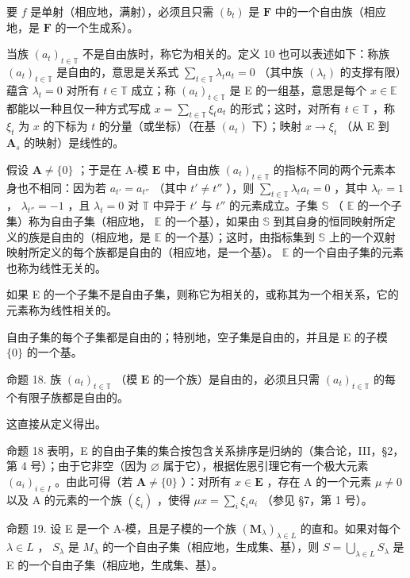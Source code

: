要 \(f\) 是单射（相应地，满射），必须且只需 \((b_t)\) 是 \(\mathbf{F}\) 中的一个自由族（相应地，是 \(\mathbf{F}\) 的一个生成系）。

当族 \((a_{t})_{t\in \mathbb{T}}\) 不是自由族时，称它为相关的。定义 10 也可以表述如下：称族 \((a_{t})_{t\in \mathbb{T}}\) 是自由的，意思是关系式 \(\sum_{t\in \mathbb{T}}\lambda_t a_t = 0\) （其中族 \((\lambda_t)\) 的支撑有限）蕴含 \(\lambda_{t} = 0\) 对所有 \(t\in \mathbb{T}\) 成立；称 \((a_{t})_{t\in \mathbb{T}}\) 是 E 的一组基，意思是每个 \(x\in \mathbb{E}\) 都能以一种且仅一种方式写成 \(x = \sum_{t\in \mathbb{T}}\xi_t a_t\) 的形式；这时，对所有 \(t\in \mathbb{T}\) ，称 \(\xi_{t}\) 为 \(x\) 的下标为 \(t\) 的分量（或坐标）（在基 \((a_{t})\) 下）；映射 \(x\to \xi_t\) （从 E 到 \(\mathbf{A}_s\) 的映射）是线性的。

假设 \(\mathbf{A} \neq \{0\}\) ；于是在 A-模 \(\mathbf{E}\) 中，自由族 \((a_t)_{t \in \mathbb{T}}\) 的指标不同的两个元素本身也不相同：因为若 \(a_{t'} = a_{t''}\) （其中 \(t' \neq t''\) ），则 \(\sum_{t \in \mathbb{T}} \lambda_t a_t = 0\) ，其中 \(\lambda_{t'} = 1\) ， \(\lambda_{t''} = -1\) ，且 \(\lambda_t = 0\) 对 \(\mathbb{T}\) 中异于 \(t'\) 与 \(t''\) 的元素成立。子集 \(\mathbb{S}\) （ \(\mathbb{E}\) 的一个子集）称为自由子集（相应地， \(\mathbb{E}\) 的一个基），如果由 \(\mathbb{S}\) 到其自身的恒同映射所定义的族是自由的（相应地，是 \(\mathbb{E}\) 的一个基）；这时，由指标集到 \(\mathbb{S}\) 上的一个双射映射所定义的每个族都是自由的（相应地，是一个基）。 \(\mathbb{E}\) 的一个自由子集的元素也称为线性无关的。

如果 E 的一个子集不是自由子集，则称它为相关的，或称其为一个相关系，它的元素称为线性相关的。

自由子集的每个子集都是自由的；特别地，空子集是自由的，并且是 E 的子模 \(\{0\}\) 的一个基。

命题 18. 族 \((a_{t})_{t\in \mathbb{T}}\) （模 \(\mathbf{E}\) 的一个族）是自由的，必须且只需 \((a_{t})_{t\in \mathbb{T}}\) 的每个有限子族都是自由的。

这直接从定义得出。

命题 18 表明，E 的自由子集的集合按包含关系排序是归纳的（集合论，III，§2，第 4 号）；由于它非空（因为 \(\varnothing\) 属于它），根据佐恩引理它有一个极大元素 \((a_{i})_{i\in I}\) 。由此可得（若 \(\mathbf{A}\neq \{0\}\) ）：对所有 \(x\in \mathbf{E}\) ，存在 A 的一个元素 \(\mu \neq 0\) 以及 A 的元素的一个族 \((\xi_{i})\) ，使得 \(\mu x = \sum_{i}\xi_{i}a_{i}\) （参见 §7，第 1 号）。

命题 19. 设 E 是一个 A-模，且是子模的一个族 \((\mathbf{M}_{\lambda})_{\lambda \in L}\) 的直和。如果对每个 \(\lambda \in L\) ， \(S_{\lambda}\) 是 \(M_{\lambda}\) 的一个自由子集（相应地，生成集、基），则 \(S = \bigcup_{\lambda \in L} S_{\lambda}\) 是 E 的一个自由子集（相应地，生成集、基）。

